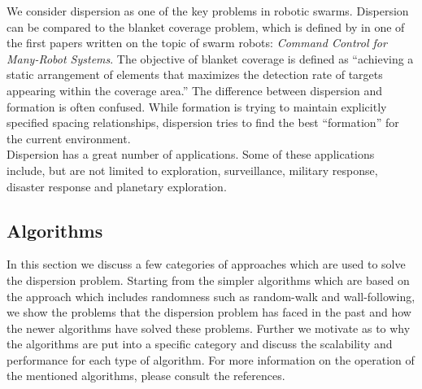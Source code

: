 We consider dispersion as one of the key problems in robotic swarms.\cite{ugur2007dispersion,mclurkin2007distributed,ludwig2006robotic} Dispersion can be compared to the blanket coverage problem, which is defined by in one of the first papers written on the topic of swarm robots: \emph{Command Control for Many-Robot Systems}.\cite{gage1992command} The objective of blanket coverage is defined as ``achieving a static arrangement of elements that maximizes the detection rate of targets appearing within the coverage area.''\cite{gage1992command} The difference between dispersion and formation is often confused. While formation is trying to maintain explicitly specified spacing relationships, dispersion tries to find the best ``formation'' for the current environment. \\
Dispersion has a great number of applications. Some of these applications include, but are not limited to exploration, surveillance, military response, disaster response and planetary exploration.\cite{ludwig2006robotic,Penders2011,mclurkin2007distributed} 

\subsection{Algorithms}
In this section we discuss a few categories of approaches which are used to solve the dispersion problem.
Starting from the simpler algorithms which are based on the approach which includes randomness such as random-walk and wall-following, we show the problems that the dispersion problem has faced in the past and how the newer algorithms have solved these problems.
Further we motivate as to why the algorithms are put into a specific category and discuss the scalability and performance for each type of algorithm.
For more information on the operation of the mentioned algorithms, please consult the references.

